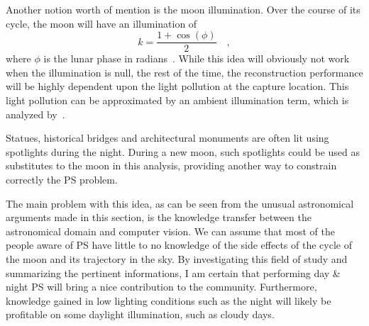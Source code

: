 
Another notion worth of mention is the moon illumination. Over the course of its cycle, the moon will have an illumination of
\begin{equation}
k = \frac{1 + \cos(\phi)}{2}  \quad,
\end{equation}
where $\phi$ is the lunar phase in radians~\cite{Meeus1991}. While this idea will obviously not work when the illumination is null, the rest of the time, the reconstruction performance will be highly dependent upon the light pollution at the capture location. This light pollution can be approximated by an ambient illumination term, which is analyzed by~\cite{Angelopoulou2013}.

Statues, historical bridges and architectural monuments are often lit using spotlights during the night. During a new moon, such spotlights could be used as substitutes to the moon in this analysis, providing another way to constrain correctly the PS problem.

The main problem with this idea, as can be seen from the unusual astronomical arguments made in this section, is the knowledge transfer between the astronomical domain and computer vision. We can assume that most of the people aware of PS have little to no knowledge of the side effects of the cycle of the moon and its trajectory in the sky. By investigating this field of study and summarizing the pertinent informations, I am certain that performing day \& night PS will bring a nice contribution to the community. Furthermore, knowledge gained in low lighting conditions such as the night will likely be profitable on some daylight illumination, such as cloudy days.





